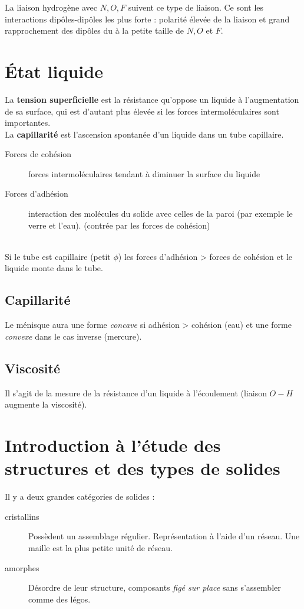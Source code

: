 \documentclass[british,french,11pt, a4paper, openany]{book}
\begin{document}
	La liaison hydrogène avec $N, O, F$ suivent ce type de liaison. Ce sont les interactions dipôles-dipôles les plus forte : polarité élevée de la liaison et grand rapprochement des dipôles du à la petite taille de $N, O$ et $F$.
	
	\section{État liquide}
	La \textbf{tension superficielle} est la résistance qu'oppose un liquide à l'augmentation de sa surface, qui est d'autant plus élevée si les forces intermoléculaires sont importantes.\\
	
	La \textbf{capillarité} est l'ascension spontanée d'un liquide dans un tube capillaire.
	\begin{description}
		\item[Forces de cohésion] forces intermoléculaires tendant à diminuer la surface du liquide
		\item[Forces d'adhésion] interaction des molécules du solide avec celles de la paroi (par exemple le verre et l'eau). (contrée par les forces de cohésion)
	\end{description}
	\ \\
	Si le tube est capillaire (petit $\phi$) les forces d'adhésion > forces de cohésion et le liquide monte dans le tube.
	
	\subsection*{Capillarité}
	Le ménisque aura une forme \textit{concave} si adhésion > cohésion (eau) et une forme \textit{convexe} dans le cas inverse (mercure).
	
	\subsection*{Viscosité}
	Il s'agit de la mesure de la résistance d'un liquide à l'écoulement (liaison $O-H$ augmente la viscosité).
	
	\section{Introduction à l'étude des structures et des types de solides}
	Il y a deux grandes catégories de solides : 
	\begin{description}
		\item[cristallins] Possèdent un assemblage régulier. Représentation à l'aide d'un réseau. Une maille est la plus petite unité de réseau.
		\item[amorphes] Désordre de leur structure, composants \textit{figé sur place} sans s'assembler comme des légos.
	\end{description}
	
\end{document}
